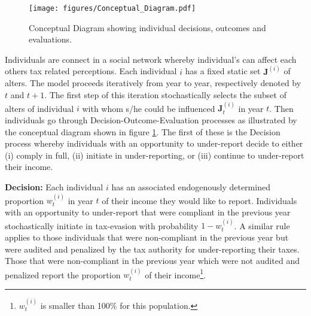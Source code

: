 \documentclass{NSF_proposal_mod}
\begin{document}
\begin{figure}%
\centering
\vspace{-20pt}
 \texttt{[image: figures/Conceptual\_Diagram.pdf]} 
\vspace{-5pt}
   \label{Fig:ConceptualDiagram}
\caption{Conceptual Diagram showing individual decisions, outcomes and evaluations.}
\end{figure}
Individuals are connect in a social network whereby individual's can affect each others tax related perceptions.  Each individual $i$ has a fixed static set $\mathbf{J}^{(i)}$ of alters.  The model proceeds iteratively from year to year, respectively denoted by $t$ and $t+1$. The first step of this iteration stochastically selects the subset of alters of individual $i$ with whom s/he could be influenced $\mathbf{J}^{(i)}_t$ in year $t$.  Then individuals go through Decision-Outcome-Evaluation processes as illustrated by the conceptual diagram shown in figure \ref{Fig:ConceptualDiagram}. The first of these is the Decision process whereby individuals with an opportunity to under-report decide to either (i) comply in full, (ii) initiate in under-reporting, or (iii) continue to under-report their income. 
\vspace{5pt}

{\bf Decision:} Each individual $i$ has an associated endogenously determined proportion $w^{(i)}_t$ in year $t$ of their income they would like to report. Individuals with an opportunity to under-report that were compliant in the previous year stochastically initiate in tax-evasion with probability $1-w^{(i)}_t$. A similar rule applies to those individuals that were non-compliant in the previous year but were audited and penalized by the tax authority for under-reporting their taxes. Those that were non-compliant in the previous year which were not audited and penalized report the proportion $w^{(i)}_t$  of their income\footnote{ $w^{(i)}_t$  is smaller than 100\% for this population.}.
\end{document}
